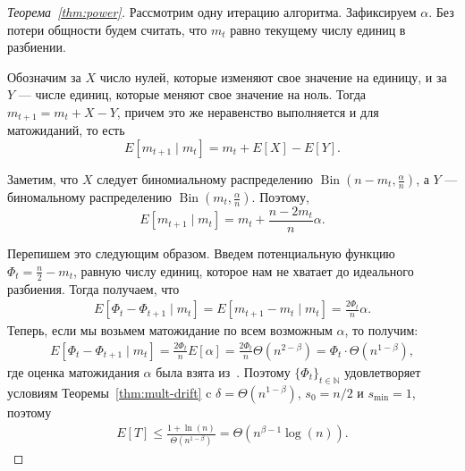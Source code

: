 \documentclass[times]{itmo-student-thesis}
\newcommand{\N}{{\mathbb N}}
\DeclareMathOperator{\Bin}{Bin}
\begin{document}
\begin{proof}[Теорема~\ref{thm:power}]
Рассмотрим одну итерацию алгоритма. Зафиксируем $\alpha$. Без потери общности будем считать, что $m_t$ равно текущему числу единиц в разбиении.

Обозначим за $X$ число нулей, которые изменяют свое значение на единицу, и за $Y$ --- числе единиц, которые меняют свое значение на ноль. Тогда $m_{t + 1} = m_t + X - Y$, причем это же неравенство выполняется и для матожиданий, то есть
\[
  E[m_{t + 1} \mid m_t] = m_t + E[X] - E[Y].
\]

Заметим, что $X$ следует биномиальному распределению $\Bin(n - m_t, \frac{\alpha}{n})$, а $Y$ --- биномальному распределению $\Bin(m_t, \frac{\alpha}{n})$.
Поэтому,
\[
  E[m_{t + 1} \mid m_t] = m_t + \frac{n - 2m_t}{n} \alpha.
\]

Перепишем это следующим образом. Введем  потенциальную функцию $\Phi_t = \frac{n}{2} - m_t$, равную числу единиц, которое нам не хватает до идеального разбиения. Тогда получаем, что
\begin{align*}
  E[\Phi_t - \Phi_{t + 1} \mid m_t] = E[m_{t + 1} - m_t \mid m_t]  =  \frac{2\Phi_t}{n}\alpha.
\end{align*}
Теперь, если мы возьмем матожидание по всем возможным $\alpha$, то получим:
\begin{align*}
  E[\Phi_t - \Phi_{t + 1} \mid m_t] =  \frac{2\Phi_t}{n}E[\alpha] = \frac{2\Phi_t}{n}\Theta(n^{2 - \beta}) = \Phi_t \cdot \Theta(n^{1 - \beta}),
\end{align*}
где оценка матожидания $\alpha$ была взята из~\cite{Antipov2020}. Поэтому $\{\Phi_t\}_{t \in \N}$ удовлетворяет условиям Теоремы~\ref{thm:mult-drift} c $\delta = \Theta(n^{1 - \beta})$, $s_0 = n/2$ и $s_{\min} = 1$, поэтому
\begin{align*}
  E[T] \le \frac{1 + \ln(n)}{\Theta(n^{1 - \beta})} = \Theta(n^{\beta - 1}\log(n)).
\end{align*}




\end{proof}
\end{document}

